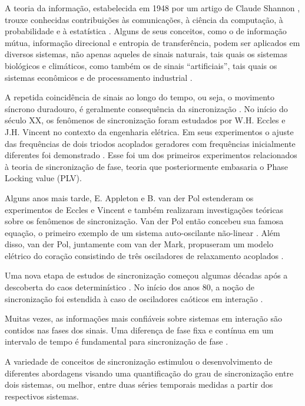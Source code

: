 \documentclass[
	12pt,				%
	openright,			%
	twoside,			%
	a4paper,			%
	english,			%
	french,				%
	spanish,			%
	brazil				%
	]{abntex2}
\begin{document}
A teoria da informação, estabelecida em 1948 por um artigo de Claude Shannon \cite{shannon1948mathematical}, trouxe conhecidas contribuições às comunicações, à ciência da computação, à probabilidade e à estatística \cite{cover2012elements}. Alguns de seus conceitos, como o de informação mútua, informação direcional e entropia de transferência, podem ser aplicados em diversos sistemas, não apenas aqueles de sinais naturais, tais quais os sistemas biológicos e climáticos, como também os de sinais “artificiais”, tais quais os sistemas econômicos e de processamento industrial \cite{juliana}.

A repetida coincidência de sinais ao longo do tempo, ou seja, o movimento síncrono duradouro, é geralmente consequência da sincronização \cite{kraskov2004synchronization}. No início do século XX, os fenômenos de sincronização foram estudados por W.H. Eccles e J.H. Vincent no contexto da engenharia elétrica. Em seus experimentos o ajuste das frequências de dois triodos acoplados geradores com frequências inicialmente diferentes foi demonstrado \cite{eccles}. Esse foi um dos primeiros experimentos relacionados à teoria de sincronização de fase, teoria que posteriormente embasaria o Phase Locking value (PLV).

Alguns anos mais tarde, E. Appleton \cite{appleton1922automatic} e B. van der Pol estenderam os experimentos de Eccles e Vincent e também realizaram investigações teóricas sobre os fenômenos de sincronização. Van der Pol então concebeu sua famosa equação, o primeiro exemplo de um sistema auto-oscilante não-linear \cite{van1927vii}. Além disso, van der Pol, juntamente com van der Mark, propuseram um modelo elétrico do coração consistindo de três osciladores de relaxamento acoplados \cite{van1928lxxii}. 

Uma nova etapa de estudos de sincronização começou algumas décadas após a descoberta do caos determinístico \cite{lorenz1963mechanics}. No início dos anos 80, a noção de sincronização foi estendida à caso de osciladores caóticos em interação \cite{PhysRevLett.64.821}. 

 Muitas vezes, as informações mais confiáveis sobre sistemas em interação são contidos nas fases dos sinais. Uma diferença de fase fixa e contínua em um intervalo de tempo é fundamental para sincronização de fase \cite{kraskov2004synchronization}. 

A variedade de conceitos de sincronização estimulou o desenvolvimento de   diferentes abordagens visando uma quantificação do grau de sincronização entre dois sistemas, ou melhor, entre duas séries temporais medidas a partir dos respectivos sistemas. 
\end{document}
